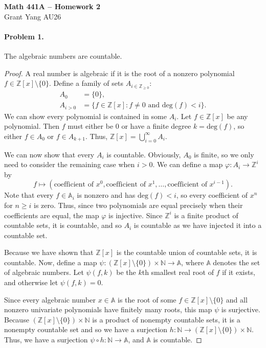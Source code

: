 \documentclass[12pt]{article}
\begin{document}
\begin{center} {\large \textbf{Math 441A -- Homework 2}} \smallskip \\ 
    Grant Yang \hspace{1em} AU26
 \end{center}

\paragraph{Problem 1.} The algebraic numbers are countable. 

\begin{proof}
A real number is algebraic if it is the root of a nonzero polynomial $f \in \mathbb Z[x] \setminus \{0\}$. Define a family of sets $A_{i \in \mathbb Z_{\ge 0}}$:
\begin{align*} 
    A_0 &= \{0\}, \\
    A_{i>0} &= \{ f \in \mathbb Z[x] : f \neq 0 \text{ and }\mathrm{deg}(f) < i\}.
\end{align*}
We can show every polynomial is contained in some $A_i$. Let $f \in \mathbb Z[x]$ be any polynomial. Then $f$ must either be $0$ or have a finite degree $k =\mathrm{deg}(f)$, so either $f \in A_0$ or $f \in A_{k + 1}$. Thus, $\mathbb Z[x] = \bigcup_{i=0}^\infty A_i$.

We can now show that every $A_i$ is countable. Obviously, $A_0$ is finite, so we only need to consider the remaining case when $i > 0$. We can define a map $\varphi : A_i \to \mathbb Z^i$ by 
\[ f \mapsto (\text{coefficient of } x^0, \text{coefficient of } x^1, \dots, \text{coefficient of } x^{i - 1}).\]
Note that every $f \in \mathbb A_{i}$ is nonzero and has $\mathrm{deg}(f) < i$, so every coefficient of $x^n$ for $n \ge i$ is zero. Thus, since two polynomials are equal precisely when their coefficients are equal, the map $\varphi$ is injective. Since $\mathbb Z^i$ is a finite product of countable sets, it is countable, and so $A_i$ is countable as we have injected it into a countable set.

Because we have shown that $\mathbb Z[x]$ is the countable union of countable sets, it is countable. Now, define a map $\psi : (\mathbb Z[x] \setminus \{0\}) \times \mathbb N \to \mathbb A$, where $\mathbb A$ denotes the set of algebraic numbers. Let $\psi(f, k)$ be the $k$th smallest real root of $f$ if it exists, and otherwise let $\psi(f, k) = 0$. 

Since every algebraic number $x \in \mathbb A$ is the root of some $f \in \mathbb Z[x] \setminus \{0\}$ and all nonzero univariate polynomials have finitely many roots, this map $\psi$ is surjective. Because  $(\mathbb Z[x] \setminus \{0\}) \times \mathbb N$ is a product of nonempty countable sets, it is a nonempty countable set and so we have a surjection $h : \mathbb N \to (\mathbb Z[x] \setminus \{0\}) \times \mathbb N$. Thus, we have a surjection $\psi \circ h : \mathbb N \to \mathbb A$, and $\mathbb A$ is countable.
\end{proof}
\end{document}
